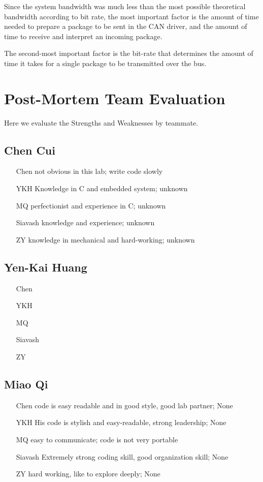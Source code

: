 \documentclass[a4paper]{article}
\begin{document}
Since the system bandwidth was much less than the most possible theoretical bandwidth according to bit rate, the most important factor is the amount of time needed to prepare a package to be sent in the CAN driver, and the amount of time to receive and interpret an incoming package.

The second-most important factor is the bit-rate that determines the amount of time it takes for a single package to be transmitted over the bus.

\newpage
\section{Post-Mortem Team Evaluation}
Here we evaluate the Strengths and Weaknesses by teammate.

\subsection{Chen Cui}
\begin{itemize}
\item[Chen] not obvious in this lab; write code slowly
\item[YKH] Knowledge in C and embedded system; unknown
\item[MQ] perfectionist and experience in C; unknown
\item[Siavash] knowledge and experience; unknown
\item[ZY] knowledge in mechanical and hard-working; unknown
\end{itemize}

\subsection{Yen-Kai Huang}
\begin{itemize}
\item[Chen]
\item[YKH] 
\item[MQ]
\item[Siavash]
\item[ZY]
\end{itemize}

\subsection{Miao Qi}
\begin{itemize}
\item[Chen]	code is easy readable and in good style, good lab partner; None
\item[YKH]	His code is stylish and easy-readable, strong leadership; None
\item[MQ]	easy to communicate; code is not very portable
\item[Siavash]	Extremely strong coding skill, good organization skill; None
\item[ZY]	hard working, like to explore deeply; None
\end{itemize}
\end{document}

